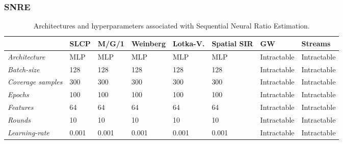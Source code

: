 \documentclass[twoside]{article}
\begin{document}
\subsubsection{SNRE}
\begin{table}[h!]
    \centering
    \begin{tabular}{llllllll}
        \toprule
        & SLCP & M/G/1 & Weinberg & Lotka-V. & Spatial SIR & GW & Streams \\
        \midrule
        \emph{Architecture} & MLP & MLP & MLP & MLP & MLP & Intractable & Intractable \\
        \emph{Batch-size} & 128 & 128 & 128 & 128 & 128 & Intractable & Intractable \\
        \emph{Coverage samples} & 300 & 300 & 300 & 300 & 300 & Intractable & Intractable \\
        \emph{Epochs} & 100 & 100 & 100 & 100 & 100 & Intractable & Intractable \\
        \emph{Features} & 64 & 64 & 64 & 64 & 64 & Intractable & Intractable \\
        \emph{Rounds} & 10 & 10 & 10 & 10 & 10 & Intractable & Intractable \\
        \emph{Learning-rate} & 0.001 & 0.001 & 0.001 & 0.001 & 0.001 & Intractable & Intractable \\
        \bottomrule
    \end{tabular}
    \caption{Architectures and hyperparameters associated with Sequential Neural Ratio Estimation.}
    \label{tab:snre_hyperparameters}
\end{table}
\end{document}
